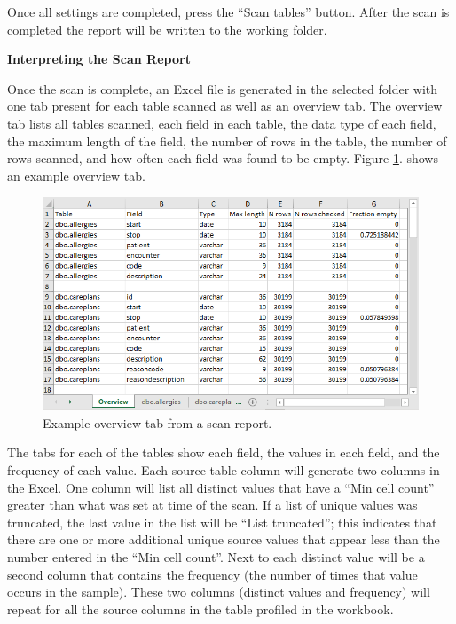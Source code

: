 \documentclass[11pt]{book}
\theoremstyle{definition}
\theoremstyle{definition}
\theoremstyle{definition}
\theoremstyle{remark}
\begin{document}
Once all settings are completed, press the ``Scan tables'' button. After the scan is completed the report will be written to the working folder.

\textbf{Interpreting the Scan Report}

Once the scan is complete, an Excel file is generated in the selected folder with one tab present for each table scanned as well as an overview tab. The overview tab lists all tables scanned, each field in each table, the data type of each field, the maximum length of the field, the number of rows in the table, the number of rows scanned, and how often each field was found to be empty. Figure \ref{fig:ScanOverviewTab}. shows an example overview tab.

\begin{figure}
\includegraphics[width=1\linewidth]{images/ExtractTransformLoad/ScanOverviewTab} \caption{Example overview tab from a scan report.}\label{fig:ScanOverviewTab}
\end{figure}

The tabs for each of the tables show each field, the values in each field, and the frequency of each value. Each source table column will generate two columns in the Excel. One column will list all distinct values that have a ``Min cell count'' greater than what was set at time of the scan. If a list of unique values was truncated, the last value in the list will be ``List truncated''; this indicates that there are one or more additional unique source values that appear less than the number entered in the ``Min cell count''. Next to each distinct value will be a second column that contains the frequency (the number of times that value occurs in the sample). These two columns (distinct values and frequency) will repeat for all the source columns in the table profiled in the workbook.
\end{document}
